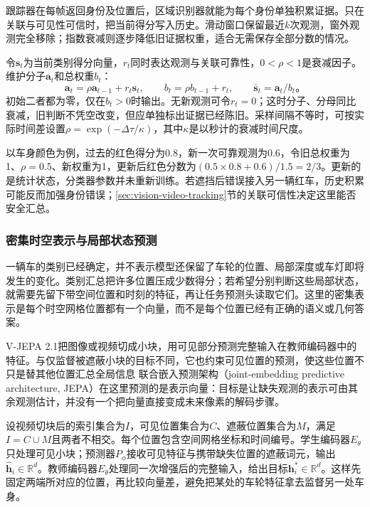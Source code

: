 跟踪器在每帧返回身份及位置后，区域识别器就能为每个身份单独积累证据。只在关联与可见性可信时，把当前得分写入历史。滑动窗口保留最近$k$次观测，窗外观测完全移除；指数衰减则逐步降低旧证据权重，适合无需保存全部分数的情况。

令$\bm{s}_t$为当前类别得分向量，$r_t$同时表达观测与关联可靠性，$0<\rho<1$是衰减因子。维护分子$\bm{a}_t$和总权重$b_t$：
\begin{equation}
  \bm{a}_t=\rho\bm{a}_{t-1}+r_t\bm{s}_t,\qquad
  b_t=\rho b_{t-1}+r_t,\qquad
  \bar{\bm{s}}_t=\bm{a}_t/b_t\text{。}
  \label{eq:vision-video-decay}
\end{equation}
初始二者都为零，仅在$b_t>0$时输出。无新观测可令$r_t=0$；这时分子、分母同比衰减，旧判断不凭空改变，但应单独标出证据已经陈旧。采样间隔不等时，可按实际时间差设置$\rho=\exp(-\Delta\tau/\kappa)$，其中$\kappa$是以秒计的衰减时间尺度。

以车身颜色为例，过去的红色得分为0.8，新一次可靠观测为0.6，令旧总权重为1、$\rho=0.5$、新权重为1，更新后红色分数为$(0.5\times0.8+0.6)/1.5=2/3$。更新的是统计状态，分类器参数并未重新训练。若遮挡后错误接入另一辆红车，历史积累可能反而加强身份错误；\ref{sec:vision-video-tracking}节的关联可信性决定这里能否安全汇总。

\subsubsection{密集时空表示与局部状态预测}
\label{sec:vision-video-dense-state}

一辆车的类别已经确定，并不表示模型还保留了车轮的位置、局部深度或车灯即将发生的变化。类别汇总把许多位置压成少数得分；若希望分别判断这些局部状态，就需要先留下带空间位置和时刻的特征，再让任务预测头读取它们。这里的密集表示是每个时空网格位置都有一个向量，而不是每个位置已经有正确的语义或几何答案。

V-JEPA 2.1把图像或视频切成小块，用可见部分预测完整输入在教师编码器中的特征。与仅监督被遮蔽小块的目标不同，它也约束可见位置的预测，使这些位置不只是替其他位置汇总全局信息 联合嵌入预测架构（joint-embedding predictive architecture, JEPA）在这里预测的是表示向量：目标是让缺失观测的表示可由其余观测估计，并没有一个把向量直接变成未来像素的解码步骤。

设视频切块后的索引集合为$I$，可见位置集合为$C$、遮蔽位置集合为$M$，满足$I=C\cup M$且两者不相交。每个位置包含空间网格坐标和时间编号。学生编码器$E_\theta$只处理可见小块；预测器$P_\phi$接收可见特征与携带缺失位置的遮蔽词元，输出$\widehat{\bm{h}}_i\in\mathbb{R}^{d}$。教师编码器$E_{\bar{\theta}}$处理同一次增强后的完整输入，给出目标$\bm{h}^{*}_i\in\mathbb{R}^{d}$。这样先固定两端所对应的位置，再比较向量差，避免把某处的车轮特征拿去监督另一处车身。

